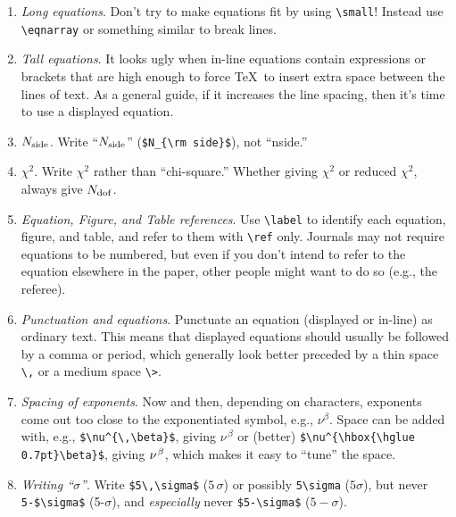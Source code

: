 \documentclass[letterpaper,11pt]{article}
\begin{document}
\begin{enumerate}
\item {\it Long equations\/}. Don't try to make equations fit by using
\verb|\small|!  Instead use \verb|\eqnarray| or something similar to break lines.

\item {\it Tall equations\/}. It looks ugly when in-line equations contain
expressions or brackets that are high enough to force \TeX\ to insert extra
space between the lines of text.  As a general guide, if it increases the line
spacing, then it's time to use a displayed equation.

\item {\it $N_{\rm side}$}.  Write ``$N_{\rm side}$'' (\verb|$N_{\rm side}$|),
not ``nside.''

\item {$\chi^2$.}  Write $\chi^2$ rather than ``chi-square.''  Whether giving
$\chi^2$ or reduced $\chi^2$, always give $N_{\rm dof}$.

\item {\it Equation, Figure, and Table references\/}. Use \verb|\label| to identify each equation, figure, and table, and refer to them with \verb|\ref| only.  Journals may not require equations to be numbered, but even if you don't intend to refer to the equation
elsewhere in the paper, other people might want to do so (e.g., the referee).

\item {\it Punctuation and equations}.  Punctuate an equation (displayed or in-line) as ordinary text.  
This means that displayed equations should
usually be followed by a comma or period, which generally look better preceded
by a thin space \verb|\,| or a medium space \verb|\>|.

\item {\it Spacing of exponents\/}.  Now and then, depending on characters,
exponents come out too close to the exponentiated symbol, e.g., $\nu^\beta$.
Space can be added with, e.g., \verb|$\nu^{\,\beta}$|, giving $\nu^{\,\beta}$ or
(better) \verb|$\nu^{\hbox{\hglue 0.7pt}\beta}$|, giving
$\nu^{\hbox{\hglue 0.7pt}\beta}$, which makes it easy to ``tune'' the space.

\item {\it Writing ``$\sigma$''}.  Write
\verb|$5\,\sigma$| ($5\,\sigma$) or possibly
\verb|5\sigma| ($5\sigma$), but never \verb|5-$\sigma$| (5-$\sigma$), and
{\it especially\/} never \verb|$5-\sigma$| ($5-\sigma$).



\end{enumerate}
\end{document}
